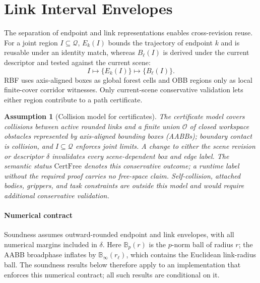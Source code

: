 \documentclass[journal]{IEEEtran}
\newtheorem{assumption}{Assumption}
\newcommand{\rbf}{RBF}
\newcommand{\Ball}{\ensuremath{\mathbb{B}}}
\newcommand{\Q}{\ensuremath{\mathcal{Q}}}
\begin{document}
\section{Link Interval Envelopes}\label{sec:link_envelopes}

The separation of endpoint and link representations enables cross-revision
reuse. For a joint region
$I\subseteq\Q$, $E_k(I)$ bounds the trajectory of endpoint $k$ and is reusable
under an identity match, whereas $B_\ell(I)$ is derived under the
current descriptor and tested against the current scene:
\[
I \mapsto \{E_k(I)\} \mapsto \{B_\ell(I)\}.
\]
\rbf{} uses axis-aligned boxes as global forest cells and OBB regions only as
local finite-cover corridor witnesses. Only current-scene conservative
validation lets either region contribute to a path certificate.

\begin{assumption}[Collision model for certificates]
\label{ass:collision_model}
The certificate model covers collisions between active rounded links and a
finite union $\mathcal{O}$ of closed workspace obstacles represented by
axis-aligned bounding boxes (AABBs);
boundary contact is collision, and $I\subseteq\Q$ enforces joint limits. A
change to either the scene revision or descriptor $\delta$ invalidates every
scene-dependent box and edge label.
The semantic status $\mathrm{CertFree}$ denotes this conservative outcome; a
runtime label without the required proof carries no free-space claim.
Self-collision, attached bodies, grippers, and task constraints are outside
this model and would require additional conservative validation.
\end{assumption}

\paragraph{Numerical contract}
Soundness assumes outward-rounded endpoint and link envelopes, with all
numerical margins included in $\delta$. Here $\Ball_p(r)$ is the $p$-norm ball
of radius $r$; the AABB broadphase inflates by $\Ball_\infty(r_\ell)$, which contains the
Euclidean link-radius ball. The soundness results below therefore apply to an
implementation that enforces this numerical contract; all such results are
conditional on it.
\end{document}
